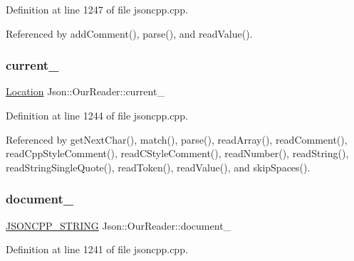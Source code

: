 Definition at line 1247 of file jsoncpp.\+cpp.



Referenced by add\+Comment(), parse(), and read\+Value().

\mbox{\label{class_json_1_1_our_reader_a5211fbbba94be80a22dd2317c621efcc}} 
\subsubsection{\texorpdfstring{current\+\_\+}{current\_}}
{\footnotesize\ttfamily \hyperlink{class_json_1_1_our_reader_a1bdc7bbc52ba87cae6b19746f2ee0189}{Location} Json\+::\+Our\+Reader\+::current\+\_\+\hspace{0.3cm}{\ttfamily [private]}}



Definition at line 1244 of file jsoncpp.\+cpp.



Referenced by get\+Next\+Char(), match(), parse(), read\+Array(), read\+Comment(), read\+Cpp\+Style\+Comment(), read\+C\+Style\+Comment(), read\+Number(), read\+String(), read\+String\+Single\+Quote(), read\+Token(), read\+Value(), and skip\+Spaces().

\mbox{\label{class_json_1_1_our_reader_a726230af83d22d25e0c76cec3408ecf1}} 
\subsubsection{\texorpdfstring{document\+\_\+}{document\_}}
{\footnotesize\ttfamily \hyperlink{json_8h_a1e723f95759de062585bc4a8fd3fa4be}{J\+S\+O\+N\+C\+P\+P\+\_\+\+S\+T\+R\+I\+NG} Json\+::\+Our\+Reader\+::document\+\_\+\hspace{0.3cm}{\ttfamily [private]}}



Definition at line 1241 of file jsoncpp.\+cpp.

\mbox{\label{class_json_1_1_our_reader_ab1f69b0260c27a0d2d65dc56e42c8f9d}} 
